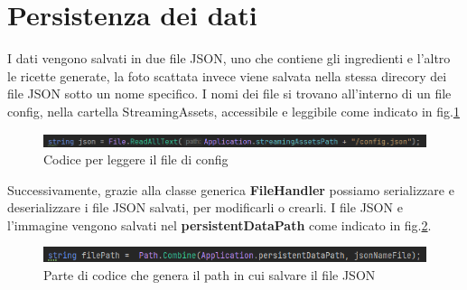 \section{Persistenza dei dati}
I dati vengono salvati in due file JSON, uno che contiene gli ingredienti e l'altro le ricette generate, la foto scattata invece viene salvata nella stessa direcory dei file JSON sotto un nome specifico. I nomi dei file si trovano all'interno di un file config, nella cartella StreamingAssets,  accessibile e leggibile come indicato in fig.\ref{fig:streamingAssets}

\begin{figure}[H]
    \centering
    \includegraphics[width=\textwidth,height=\textheight,keepaspectratio]{figures/chapter_1/streamingAssets_CODICE.png}
    \caption{Codice per leggere il file di config}
    \label{fig:streamingAssets}
\end{figure}

Successivamente, grazie alla classe generica \textbf{FileHandler} possiamo serializzare e deserializzare i file JSON salvati, per modificarli o crearli. 
I file JSON  e l'immagine vengono salvati nel \textbf{persistentDataPath} come indicato in fig.\ref{fig:persistentDataPath}.

\begin{figure}[H]
    \centering
    \includegraphics[width=\textwidth,height=\textheight,keepaspectratio]{figures/chapter_1/persistentDatapath_CODICE.png}
    \caption{Parte di codice che genera il path in cui salvare il file JSON}
    \label{fig:persistentDataPath}
\end{figure}